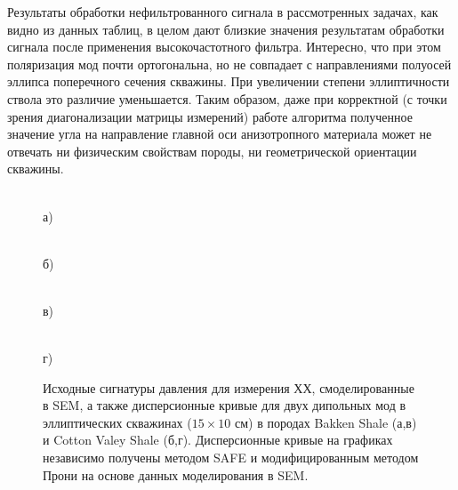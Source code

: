 \documentclass[a4paper,11pt]{article}
\begin{document}
Результаты обработки нефильтрованного сигнала в рассмотренных задачах, как видно из данных таблиц, в целом дают близкие значения результатам обработки сигнала после применения высокочастотного фильтра. Интересно, что при этом поляризация мод почти ортогональна, но не совпадает с направлениями полуосей эллипса поперечного сечения скважины. При увеличении степени эллиптичности ствола это различие уменьшается. Таким образом, даже при корректной (с точки зрения диагонализации матрицы измерений) работе алгоритма полученное значение угла на направление главной оси анизотропного материала может не отвечать ни физическим свойствам породы, ни геометрической ориентации скважины. 

\begin{figure}[h]
\centering

\begin{minipage}{0.49\linewidth}
	\centering %
	 \\
	а)
\end{minipage}
\begin{minipage}{0.49\linewidth}
	\centering %
	 \\
	б)
\end{minipage}
\begin{minipage}{0.49\linewidth}
	\centering %
	 \\
	в)
\end{minipage}
\begin{minipage}{0.49\linewidth}
	\centering %
	 \\
	г)
\end{minipage}
\caption{\footnotesize Исходные сигнатуры давления для измерения ХХ, смоделированные в SEM, а также дисперсионные кривые для двух дипольных мод в эллиптических скважинах ($15 \times 10$ см) в породах Bakken Shale (а,в) и Cotton Valey Shale (б,г). Дисперсионные кривые на графиках независимо получены методом SAFE и модифицированным методом Прони на основе данных моделирования в SEM. }
\label{fig:disp_curves_all}
\end{figure}
\end{document}
